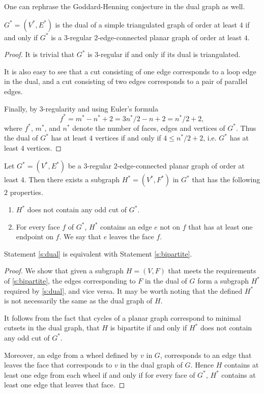 One can rephrase the Goddard-Henning conjecture in the dual graph as well.

\begin{claim} \label{c:dual}
  $G^* = (V^*, E^*)$ is the dual of a simple triangulated graph of order at least $4$
  if and only if $G^*$ is a $3$-regular $2$-edge-connected planar graph of order at least $4$.
\end{claim}
\begin{proof}
  It is trivial that $G^*$ is $3$-regular if and only if its dual is triangulated.

  It is also easy to see that a cut consisting of one edge corresponds to a loop
  edge in the dual, and a cut consisting of two edges corresponds to a pair of parallel edges.

  Finally, by $3$-regularity and using Euler's formula $$f^* = m^* - n^* + 2 =
  3n^*/2 - n + 2 = n^*/2 + 2,$$ where $f^*$, $m^*$, and $n^*$ denote the number of faces, edges
  and vertices of $G^*$. Thus the dual of $G^*$ has at least $4$ vertices if
  and only if $4 \le n^*/2 + 2$, i.e. $G^*$ has at least $4$ vertices.
\end{proof}

\begin{guess} \label{s:dual}
  Let $G^* = (V^*, E^*)$ be a $3$-regular $2$-edge-connected planar graph of order at least $4$.
  Then there exists a subgraph $H^* = (V^*, F^*)$ in $G^*$ that has the following $2$ properties.
  \begin{enumerate}
    \item $H^*$ does not contain any odd cut of $G^*$.
    \item For every face $f$ of $G^*$, $H^*$ contains an edge $e$ not on $f$ that has at least one
    endpoint on $f$. We say that $e$ leaves the face $f$.
  \end{enumerate}
\end{guess}

\begin{claim}
  Statement \ref{s:dual} is equivalent with Statement \ref{s:bipartite}.
\end{claim}
\begin{proof}
  We show that given a subgraph $H = (V, F)$ that meets the requirements of \ref{s:bipartite},
  the edges corresponding to $F$ in the dual of $G$ form a subgraph $H^*$ required by
  \ref{s:dual}, and vice versa. It may be worth noting that the defined $H^*$ is
  not necessarily the same as the dual graph of $H$.

  It follows from the fact that cycles of a planar graph correspond to minimal cutsets in the
  dual graph, that $H$ is bipartite if and only if $H^*$ does not contain any odd cut of $G^*$.

  Moreover, an edge from a wheel defined by $v$ in $G$, corresponds to an edge
  that leaves the face that corresponds to $v$ in the dual graph of $G$.
  Hence $H$ contains at least one edge from each wheel if and only if for every face
  of $G^*$, $H^*$ contains at least one edge that leaves that face.
\end{proof}

